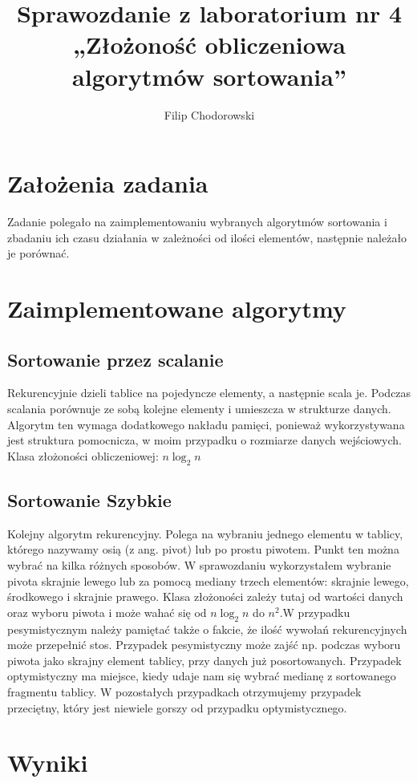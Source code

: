 \documentclass[a4paper,11pt]{article}
\author{Filip Chodorowski}
\title{Sprawozdanie z laboratorium nr 4\\
„Złożoność obliczeniowa algorytmów sortowania”}
\begin{document}
\maketitle
\tableofcontents
\section{Założenia zadania}
Zadanie polegało na zaimplementowaniu wybranych algorytmów sortowania i zbadaniu ich czasu działania w zależności od ilości elementów, następnie należało je porównać.
\newpage
\section{Zaimplementowane algorytmy}
\subsection{Sortowanie przez scalanie}
Rekurencyjnie dzieli tablice na pojedyncze elementy, a następnie scala je. Podczas scalania porównuje ze sobą kolejne elementy i umieszcza w strukturze danych. Algorytm ten wymaga dodatkowego nakładu pamięci, ponieważ wykorzystywana jest struktura pomocnicza, w moim przypadku o rozmiarze danych wejściowych. Klasa złożoności obliczeniowej:
$n\log_2 n 
$
\subsection{Sortowanie Szybkie}
Kolejny algorytm rekurencyjny. Polega na wybraniu jednego elementu w tablicy, którego nazywamy osią (z ang. pivot) lub po prostu piwotem. Punkt ten można wybrać na kilka różnych sposobów. W sprawozdaniu wykorzystałem wybranie pivota skrajnie lewego lub za pomocą mediany trzech elementów: skrajnie lewego, środkowego i skrajnie prawego.
Klasa złożoności zależy tutaj od wartości danych oraz wyboru piwota i może wahać się od
$n\log_2 n 
$
do
$n^{2}
$.W przypadku pesymistycznym należy pamiętać także o fakcie, że ilość wywołań rekurencyjnych może przepełnić stos. Przypadek pesymistyczny może zajść np. podczas wyboru piwota jako skrajny element tablicy, przy danych już posortowanych. Przypadek optymistyczny ma miejsce, kiedy udaje nam się wybrać medianę z sortowanego fragmentu tablicy. W pozostałych przypadkach otrzymujemy przypadek przeciętny, który jest niewiele gorszy od przypadku optymistycznego.
\newpage
\section{Wyniki}
\end{document}
